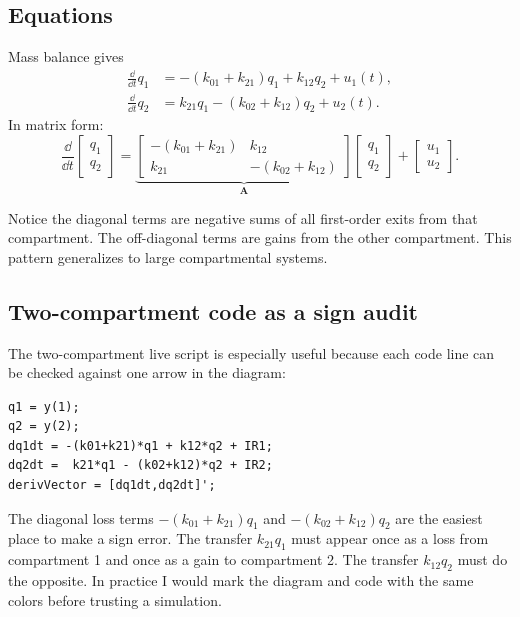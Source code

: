 \documentclass[a4paper]{article}
\newcommand{\ddt}{\frac{\dd}{\dd t}}
\newcommand{\mat}[1]{\mathbf{#1}}
\newcommand{\qone}{q_1}
\newcommand{\qtwo}{q_2}
\begin{document}
\subsection{Equations}

Mass balance gives
\[
  \begin{aligned}
  \ddt \qone
  &=-(k_{01}+k_{21})\qone+k_{12}\qtwo+u_1(t),\\
  \ddt \qtwo
  &=k_{21}\qone-(k_{02}+k_{12})\qtwo+u_2(t).
  \end{aligned}
\]
In matrix form:
\[
  \ddt
  \begin{bmatrix}
  \qone\\
  \qtwo
  \end{bmatrix}
  =
  \underbrace{
  \begin{bmatrix}
  -(k_{01}+k_{21}) & k_{12}\\
  k_{21} & -(k_{02}+k_{12})
  \end{bmatrix}}_{\mat A}
  \begin{bmatrix}
  \qone\\
  \qtwo
  \end{bmatrix}
  +
  \begin{bmatrix}
  u_1\\
  u_2
  \end{bmatrix}.
\]

Notice the diagonal terms are negative sums of all first-order exits from that compartment. The off-diagonal terms are gains from the other compartment. This pattern generalizes to large compartmental systems.

\subsection{Two-compartment code as a sign audit}

The two-compartment live script is especially useful because each code line can be checked against one arrow in the diagram:
\begin{verbatim}
q1 = y(1);
q2 = y(2);
dq1dt = -(k01+k21)*q1 + k12*q2 + IR1;
dq2dt =  k21*q1 - (k02+k12)*q2 + IR2;
derivVector = [dq1dt,dq2dt]';
\end{verbatim}
The diagonal loss terms \(-(k_{01}+k_{21})q_1\) and \(-(k_{02}+k_{12})q_2\) are the easiest place to make a sign error. The transfer \(k_{21}q_1\) must appear once as a loss from compartment 1 and once as a gain to compartment 2. The transfer \(k_{12}q_2\) must do the opposite. In practice I would mark the diagram and code with the same colors before trusting a simulation.
\end{document}
